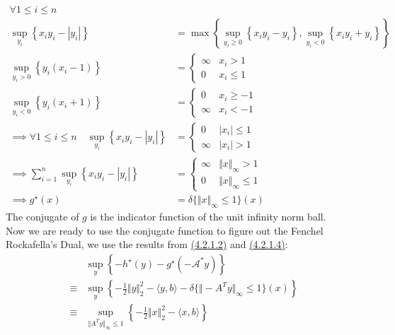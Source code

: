 \documentclass[]{article}
\begin{document}
    \begin{align*}\tag{4.2.1.4}\label{eqn:4.2.1.4}
        \forall 1 \le i \le n & 
        \\
        \sup_{y_i} \left\lbrace
            x_i y_i - |y_i|
        \right\rbrace &= 
        \max\left\lbrace
            \sup_{y_i \ge 0}\left\lbrace
                x_i y_i - y_i
            \right\rbrace, 
            \sup_{y_i < 0}\left\lbrace
                x_i y_i + y_i
            \right\rbrace
        \right\rbrace
        \\
        \sup_{y_i> 0} \left\lbrace
            y_i(x_i - 1)
        \right\rbrace &= 
        \begin{cases}
            \infty & x_i > 1 
            \\
            0 & x_i \le 1
        \end{cases}
        \\
        \sup_{y_i < 0}\left\lbrace
                y_i(x_i + 1)
        \right\rbrace
        &= 
        \begin{cases}
            0 & x_i \ge - 1
            \\
            \infty & x_i < -1
        \end{cases}
        \\
        \implies
        \forall 1 \le i \le n 
        \quad
        \sup_{y_i} \left\lbrace
            x_i y_i - |y_i|
        \right\rbrace &=
        \begin{cases}
            0 &|x_i| \le 1
            \\
            \infty & |x_i| > 1
        \end{cases}
        \\
        \implies
        \sum_{i = 1}^{n} \sup_{y_i} \left\lbrace
            x_iy_i - |y_i|
        \right\rbrace
        &= \begin{cases}
            \infty & \Vert x\Vert_\infty > 1
            \\
            0 & \Vert x\Vert_\infty \le 1
        \end{cases}
        \\
        \implies
        g^\star(x) &= \delta\{\Vert x\Vert_\infty \le 1\}(x)
    \end{align*}
    The conjugate of $g$ is the indicator function of the unit infinity norm ball. 
    \\
    Now we are ready to use the conjugate function to figure out the Fenchel Rockafella's Dual, we use the results from \hyperref[eqn:4.2.1.2]{(4.2.1.2)} and \hyperref[eqn:4.2.1.4]{(4.2.1.4)}: 
    \begin{align*}\tag{4.2.1.5}\label{eqn:4.2.1.5}
        & \sup_{y} \left\lbrace
            -h^\star(y) - g^\star(- \mathcal{A}^*y)
        \right\rbrace
        \\
        \equiv & \sup_{y} \left\lbrace
            - \frac{1}{2}\Vert y\Vert_2^2 - \langle y, b\rangle - 
            \delta\{\Vert -A^Ty\Vert_\infty \le 1\}(x)
        \right\rbrace
        \\
        \equiv&
        \sup_{\Vert A^Ty\Vert_\infty \le 1} \left\lbrace
            - \frac{1}{2}\Vert x\Vert_2^2 - \langle x, b\rangle
        \right\rbrace
    \end{align*}
\end{document}
